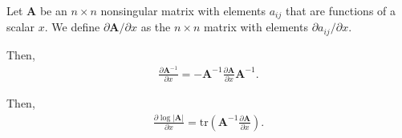 \bdefi
Let ${\mathbf A}$ be an $n \times n$ nonsingular matrix with elements $a_{ij}$ that are functions of a scalar $x$. We define ${\partial {\mathbf A}} / {\partial x}$ as the $n \times n$ matrix 
with elements  ${\partial a_{ij}} / {\partial x}$.
\edefi

\bstheo
Then,
\begin{align}
\frac{\partial {\mathbf A^{-1}}}{\partial x} = -{\mathbf A^{-1}}  \frac{\partial {\mathbf A}}{\partial x}   {\mathbf A^{-1}}. \nonumber
\end{align}
\estheo


\bstheo
Then,
\begin{align}
\frac{\partial {\log |{\mathbf A}|}}{ \partial x} =  \mathrm{tr} ({\mathbf A^{-1}}  \frac{\partial {\mathbf A}}{\partial x}). \nonumber
\end{align}
\estheo




